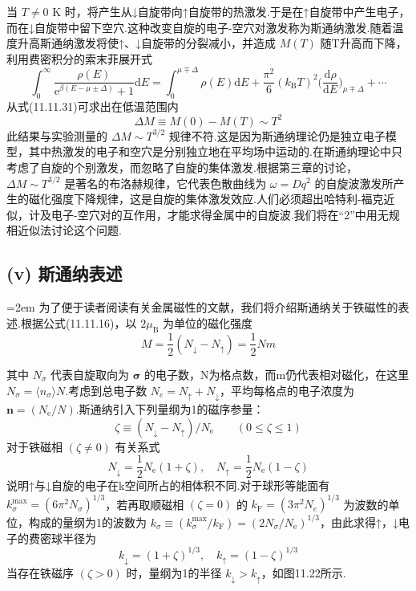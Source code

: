 当 $T\neq 0$ K 时，将产生从↓自旋带向↑自旋带的热激发.于是在↑自旋带中产生电子，而在↓自旋带中留下空穴.这种改变自旋的电子-空穴对激发称为斯通纳激发.随着温度升高斯通纳激发将使↑、↓自旋带的分裂减小，并造成 $M(T)$ 随T升高而下降，利用费密积分的索末菲展开式
\begin{equation*}
  \int_{0}^{\infty}\frac{\rho(E)}{\mathrm{e}^{\beta(E-\mu\pm\Delta)}+1}\mathrm{d}E
  =\int_{0}^{\mu\mp\Delta}\rho(E)\mathrm{d}E
  +\frac{\pi^{2}}{6}(k_{\mathrm{B}}T)^{2}\biggl(\frac{\mathrm{d}\rho}{\mathrm{d}E}\biggr)_{\mu\mp\Delta}+\cdots
\end{equation*}
从式(11.11.31)可求出在低温范围内
\begin{equation}
  \Delta M\equiv M(0)-M(T)\sim T^{2}
\end{equation}
此结果与实验测量的 $\Delta M\sim T^{3/2}$ 规律不符.这是因为斯通纳理论仍是独立电子模型，其中热激发的电子和空穴是分别独立地在平均场中运动的.在斯通纳理论中只考虑了自旋的个别激发，而忽略了自旋的集体激发.根据第三章的讨论，$\Delta M\sim T^{3/2}$ 是著名的布洛赫规律，它代表色散曲线为 $\omega=Dq^{2}$ 的自旋波激发所产生的磁化强度下降规律，这是自旋的集体激发效应.人们必须超出哈特利-福克近似，计及电子-空穴对的互作用，才能求得金属中的自旋波.我们将在“2”中用无规相近似法讨论这个问题.

\subsection*{(v) 斯通纳表述}

{\emergencystretch=2em
为了便于读者阅读有关金属磁性的文献，我们将介绍斯通纳关于铁磁性的表述.\allowbreak 根据公式(11.11.16)，以 $2\mu_{\mathrm{B}}$ 为单位的磁化强度
\begin{equation}
  M=\frac{1}{2}(N_{\downarrow}-N_{\uparrow})=\frac{1}{2}Nm
\end{equation}\par}
其中 $N_{\sigma}$ 代表自旋取向为 $\boldsymbol{\sigma}$ 的电子数，N为格点数，而m仍代表相对磁化，在这里 $N_{\sigma}=\langle n_{\sigma}\rangle N$.考虑到总电子数 $N_{e}=N_{\uparrow}+N_{\downarrow}$，平均每格点的电子浓度为 $\boldsymbol{n}=(N_{\mathrm{e}}/N)$.斯通纳引入下列量纲为1的磁序参量：
\begin{equation}
  \zeta\equiv(N_{\downarrow}-N_{\uparrow})/N_{\mathrm{e}}\qquad(0\leqslant\zeta\leqslant 1)
\end{equation}
对于铁磁相 $(\zeta\neq 0)$ 有关系式
\begin{equation}
  N_{\downarrow}=\frac{1}{2}N_{\mathrm{e}}(1+\zeta),\quad
  N_{\uparrow}=\frac{1}{2}N_{\mathrm{e}}(1-\zeta)
\end{equation}
说明↑与↓自旋的电子在k空间所占的相体积不同.对于球形等能面有 $k_{\sigma}^{\mathrm{max}}=(6\pi^{2}N_{\sigma})^{1/3}$，若再取顺磁相 $(\zeta=0)$ 的 $k_{\mathrm{F}}=(3\pi^{2}N_{e})^{1/3}$ 为波数的单位，构成的量纲为1的波数为 $k_{\sigma}\equiv(k_{\sigma}^{\mathrm{max}}/k_{\mathrm{F}})=(2N_{\sigma}/N_{\mathrm{e}})^{1/3}$，由此求得↑，↓电子的费密球半径为
\begin{equation}
  k_{\downarrow}=(1+\zeta)^{1/3},\quad k_{\uparrow}=(1-\zeta)^{1/3}
\end{equation}
当存在铁磁序 $(\zeta>0)$ 时，量纲为1的半径 $k_{\downarrow}>k_{\uparrow}$，如图11.22所示.

